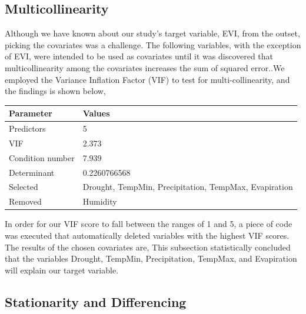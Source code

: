 \subsection{Multicollinearity}
Although we have known about our study's target variable, EVI, from the outset, picking the covariates was a challenge. The following variables, with the exception of EVI, were intended to be used as covariates until it was discovered that multicollinearity among the covariates increases the sum of squared error..We employed the Variance Inﬂation Factor (VIF) to test for multi-collinearity, and the ﬁndings is shown below,\\

\begin{center}
	\begin{tabular}{|l|l|}
		\hline\hline
		Parameter	& Values \\
		\hline\hline
		Predictors	& 5 \\
		VIF	& 2.373 \\
		Condition number 	& 7.939\\
		Determinant 	& 0.2260766568 \\
		Selected 	& Drought, TempMin, Precipitation, TempMax, Evapiration \\
		Removed 	&  Humidity\\
		\hline
	\end{tabular}
\end{center}
In order for our VIF score to fall between the ranges of 1 and 5, a piece of code was executed that automatically deleted variables with the highest VIF scores. The results of the chosen covariates are, This subsection statistically concluded that the variables Drought, TempMin, Precipitation, TempMax, and Evapiration will explain our target variable.


\subsection{Stationarity and Differencing}

